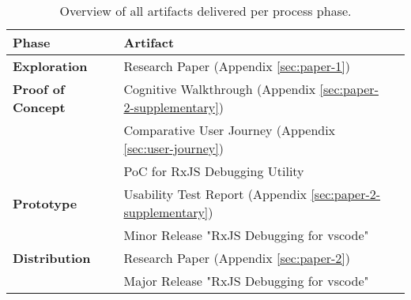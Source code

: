 
\begin{table}[h]
  \label{tbl:artifact-overview}
  \caption{Overview of all artifacts delivered per process phase.}

  \newcommand\Tstrut{\rule{0pt}{2.6ex}}       %
  \newcommand\Bstrut{\rule[-0.9ex]{0pt}{0pt}} %
  \newcommand{\TBstrut}{\Tstrut\Bstrut} %

  \begin{tabular}{llp{7.37cm}}
    \textbf{Phase}                              & \textbf{Artifact}                                     \TBstrut \\
    \hline
    \textbf{Exploration}                        & Research Paper (Appendix \ref{sec:paper-1})                                       \TBstrut \\
    \hline
    \textbf{Proof of Concept}  & Cognitive Walkthrough (Appendix \ref{sec:paper-2-supplementary})                                \TBstrut \\
                                               & Comparative User Journey (Appendix \ref{sec:user-journey})                              \Bstrut  \\
                                               & PoC for RxJS Debugging Utility                        \Bstrut \\
    \hline
    \textbf{Prototype}         & Usability Test Report (Appendix \ref{sec:paper-2-supplementary})                               \TBstrut  \\
                                               & Minor Release "RxJS Debugging for vscode" \Bstrut \\
    \hline
    \textbf{Distribution}          & Research Paper (Appendix \ref{sec:paper-2})                                      \TBstrut  \\
                                               & Major Release "RxJS Debugging for vscode" \Bstrut \\
    \hline
  \end{tabular}
\end{table}
